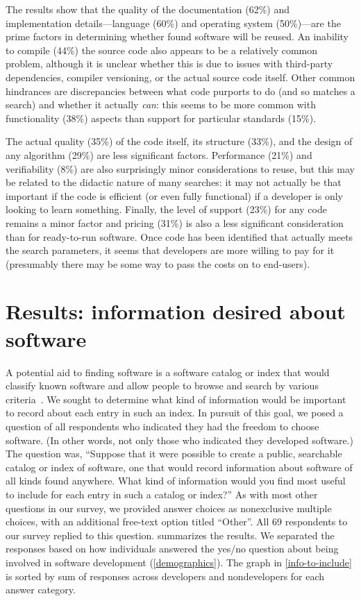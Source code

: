 \documentclass{casicswhitepaper}
\newcommand{\totalRespondents}{69\xspace}
\begin{document}
The results show that the quality of the documentation (62\%) and implementation details---language (60\%) and operating system (50\%)---are the prime factors in determining whether found software will be reused. An inability to compile (44\%) the source code also appears to be a relatively common problem, although it is unclear whether this is due to issues with third-party dependencies, compiler versioning, or the actual source code itself.  Other common hindrances are discrepancies between what code purports to do (and so matches a search) and whether it actually \emph{can}: this seems to be more common with functionality (38\%) aspects than support for particular standards (15\%).

The actual quality (35\%) of the code itself, its structure (33\%), and the design of any algorithm (29\%) are less significant factors. Performance (21\%) and verifiability (8\%) are also surprisingly minor considerations to reuse, but this may be related to the didactic nature of many searches: it may not actually be that important if the code is efficient (or even fully functional) if a developer is only looking to learn something.  Finally, the level of support (23\%) for any code remains a minor factor and pricing (31\%) is also a less significant consideration than for ready-to-run software. Once code has been identified that actually meets the search parameters, it seems that developers are more willing to pay for it (presumably there may be some way to pass the costs on to end-users).


\section{Results: information desired about software}
\label{desirable-metadata}

A potential aid to finding software is a software catalog or index that would classify known software and allow people to browse and search by various criteria~\cite{marshall2006software}.  We sought to determine what kind of information would be important to record about each entry in such an index.  In pursuit of this goal, we posed a question of all respondents who indicated they had the freedom to choose software.  (In other words, not only those who indicated they developed software.)  The question was, ``Suppose that it were possible to create a public, searchable catalog or index of software, one that would record information about software of all kinds found anywhere.  What kind of information would you find most useful to include for each entry in such a catalog or index?''  As with most other questions in our survey, we provided answer choices as nonexclusive multiple choices, with an additional free-text option titled ``Other''.  All \totalRespondents respondents to our survey replied to this question.   summarizes the results.  We separated the responses based on how individuals answered the yes/no question about being involved in software development (\ref{demographics}).  The graph in \ref{info-to-include} is sorted by sum of responses across developers and nondevelopers for each answer category.
\end{document}
